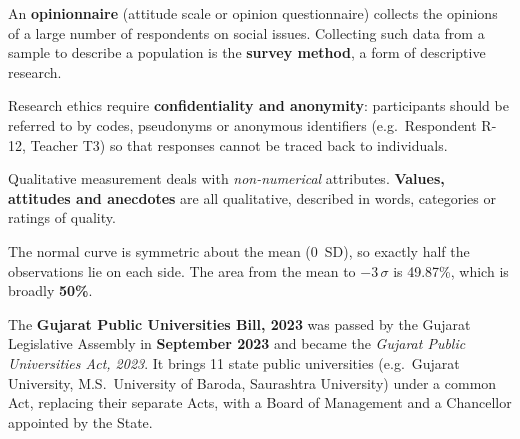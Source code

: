 An \textbf{opinionnaire} (attitude scale or opinion questionnaire) collects the opinions of a large number of respondents on social issues. Collecting such data from a sample to describe a population is the \textbf{survey method}, a form of descriptive research.

Research ethics require \textbf{confidentiality and anonymity}: participants should be referred to by codes, pseudonyms or anonymous identifiers (e.g.\ Respondent R-12, Teacher T3) so that responses cannot be traced back to individuals.

Qualitative measurement deals with \emph{non-numerical} attributes. \textbf{Values, attitudes and anecdotes} are all qualitative, described in words, categories or ratings of quality.

The normal curve is symmetric about the mean (0~SD), so exactly half the observations lie on each side. The area from the mean to $-3\,\sigma$ is 49.87\%, which is broadly \textbf{50\%}.
\begin{center}
\end{center}

The \textbf{Gujarat Public Universities Bill, 2023} was passed by the Gujarat Legislative Assembly in \textbf{September 2023} and became the \emph{Gujarat Public Universities Act, 2023}. It brings 11 state public universities (e.g.\ Gujarat University, M.S.~University of Baroda, Saurashtra University) under a common Act, replacing their separate Acts, with a Board of Management and a Chancellor appointed by the State.

